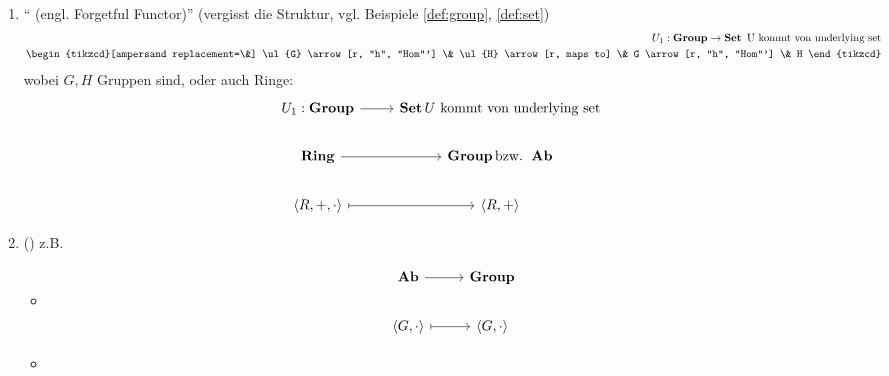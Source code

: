 \begin{beispiel}
	\begin{enumerate}
		\item `` (engl. Forgetful Functor)'' (vergisst die Struktur, vgl. Beispiele \ref{def:group}, \ref{def:set})
		\begin{align*}
			U_1: \Group \to \Set \text{ U kommt von underlying set}\\
			\begin{tikzcd}[ampersand replacement=\&]
			\ul{G} \arrow[r, "h", "Hom"'] \& \ul{H} \arrow[r, maps to] \& G \arrow[r, "h", "Hom"'] \& H
			\end{tikzcd}
		\end{align*}
		wobei $G,H$ Gruppen sind, oder auch Ringe:
		\begin{align*} %
			\begin{tikzcd}[ampersand replacement=\&]
			U_1: \Group \arrow[r] \& \Set U\text{ kommt von underlying set}\\
			\Ring \arrow[r] \& \Group \text{bzw. } \Ab\\
			\langle R, + , \cdot\rangle \arrow[r, maps to] \& \langle R, + \rangle
			\end{tikzcd}
		\end{align*}
		\item {} ()
		z.B.
		\begin{itemize}
			\item 
			\begin{align*}
				\begin{tikzcd}[ampersand replacement=\&]
				\Ab \arrow[r]                                 \& \Group                     \\
				{\langle G, \cdot \rangle} \arrow[r, maps to] \& {\langle G, \cdot \rangle}
				\end{tikzcd}
			\end{align*}
			\item 

\end{itemize}
\end{enumerate}
\end{beispiel}
